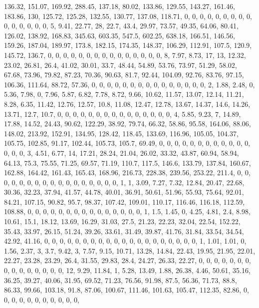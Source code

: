 \documentclass[
]{article}
\begin{document}
136.32, 151.07, 169.92, 288.45, 137.18, 80.02, 133.86, 129.55, 143.27,
161.46, 183.86, 130, 125.72, 125.28, 132.55, 130.77, 137.08, 118.71, 0,
0, 0, 0, 0, 0, 0, 0, 0, 0, 0, 0, 0, 0, 0, 5, 9.41, 22.77, 28, 22.7,
43.4, 29.97, 73.57, 49.35, 64.06, 80.41, 126.02, 138.92, 168.83, 345.63,
603.35, 547.5, 602.25, 638.18, 166.51, 146.56, 159.26, 187.04, 189.97,
173.8, 182.15, 174.35, 148.37, 106.29, 112.91, 107.5, 120.9, 145.72,
136.7, 0, 0, 0, 0, 0, 0, 0, 0, 0, 0, 0, 0, 0, 0, 0, 8, 7.97, 8.73, 17,
13, 12.32, 23.02, 26.81, 26.4, 41.02, 30.01, 33.7, 48.44, 54.89, 53.76,
73.97, 51.29, 58.02, 67.68, 73.96, 79.82, 87.23, 70.36, 90.63, 81.7,
92.44, 104.09, 92.76, 83.76, 97.15, 106.36, 111.64, 88.72, 57.36, 0, 0,
0, 0, 0, 0, 0, 0, 0, 0, 0, 0, 0, 0, 0, 2, 1.88, 2.48, 0, 5.36, 7.98, 0,
7.96, 5.87, 6.82, 7.78, 8.72, 9.66, 10.62, 11.57, 13.07, 12.14, 11.21,
8.28, 6.35, 11.42, 12.76, 12.57, 10.8, 11.08, 12.47, 12.78, 13.67,
14.37, 14.6, 14.26, 13.71, 12.7, 10.7, 0, 0, 0, 0, 0, 0, 0, 0, 0, 0, 0,
0, 0, 0, 0, 4, 5.85, 9.23, 7, 14.89, 17.88, 14.52, 24.43, 90.62, 122.29,
38.92, 79.74, 66.32, 58.86, 95.58, 164.06, 88.06, 148.02, 213.92,
152.91, 134.95, 128.42, 118.45, 133.69, 116.96, 105.05, 104.37, 105.75,
102.85, 91.17, 102.44, 105.73, 105.7, 69.49, 0, 0, 0, 0, 0, 0, 0, 0, 0,
0, 0, 0, 0, 0, 0, 3, 4.51, 6.77, 14, 17.21, 28.24, 21.04, 26.02, 33.32,
43.87, 60.94, 58.94, 64.13, 75.3, 75.55, 71.25, 69.57, 71.19, 110.7,
117.5, 146.6, 133.79, 137.84, 160.67, 162.88, 164.42, 161.43, 165.43,
168.96, 216.73, 228.38, 239.56, 253.22, 211.4, 0, 0, 0, 0, 0, 0, 0, 0,
0, 0, 0, 0, 0, 0, 0, 0, 0, 1, 1, 3.09, 7.27, 7.32, 12.84, 20.47, 22.68,
30.36, 32.23, 37.94, 41.57, 44.78, 40.01, 36.91, 50.61, 51.96, 55.93,
75.64, 92.01, 84.21, 107.15, 90.82, 95.7, 98.37, 107.42, 109.01, 110.17,
116.46, 116.18, 112.59, 108.88, 0, 0, 0, 0, 0, 0, 0, 0, 0, 0, 0, 0, 0,
0, 0, 1, 1.5, 1.45, 0, 4.25, 4.81, 2.4, 8.98, 10.61, 15.1, 18.12, 13.69,
16.29, 31.03, 27.5, 21.23, 22.23, 32.04, 22.54, 152.22, 35.43, 33.97,
26.15, 51.24, 39.26, 33.61, 31.49, 39.87, 41.76, 31.84, 33.54, 34.54,
42.92, 41.16, 0, 0, 0, 0, 0, 0, 0, 0, 0, 0, 0, 0, 0, 0, 0, 0, 0, 0, 0,
0, 1, 1.01, 1.01, 0, 1.56, 2.37, 3, 3.7, 9.42, 3, 7.57, 9.15, 10.71,
13.28, 14.84, 22.43, 19.95, 21.95, 22.01, 22.27, 23.28, 23.29, 26.4,
31.55, 29.83, 28.4, 24.27, 26.33, 22.27, 0, 0, 0, 0, 0, 0, 0, 0, 0, 0,
0, 0, 0, 0, 0, 12, 9.29, 11.84, 1, 5.28, 13.49, 1.88, 26.38, 4.46,
50.61, 35.16, 36.25, 39.27, 40.06, 31.95, 69.52, 71.23, 76.56, 91.98,
87.5, 56.36, 71.73, 88.8, 86.33, 99.66, 103.18, 91.8, 87.06, 100.67,
111.46, 101.63, 105.47, 112.35, 82.86, 0, 0, 0, 0, 0, 0, 0, 0, 0, 0, 0,
\end{document}
